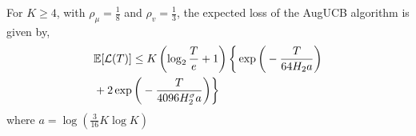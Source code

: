 \begin{theorem}
\label{Result:Theorem:1}
For $K\geq 4$, with $\rho_{\mu}=\frac{1}{8}$ and $\rho_v=\frac{1}{3}$,
the expected loss of the AugUCB algorithm is given by,
\begin{align*}
&\mathbb{E}[\mathcal{L}(T)]
 \leq K\left(\log_2\frac{T}{e}+1\right)\bigg\lbrace\exp\bigg( -\frac{T}{ 64 H_2 a}\bigg)\\
& + 2\exp\bigg(- \frac{T}{4096 H_{2}^{\sigma} a} \bigg)\bigg\rbrace
\end{align*}
where $a=\log(\frac{3}{16} K\log K)$
\end{theorem}

